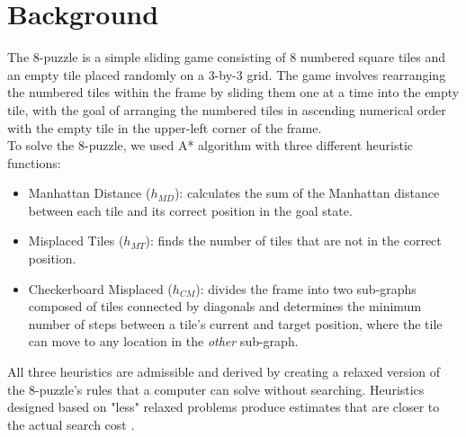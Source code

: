 
\section{Background}
\label{sec:background}
The 8-puzzle is a simple sliding game consisting of 8 numbered square tiles and an empty tile placed randomly on a 3-by-3 grid. 
The game involves rearranging the numbered tiles within the frame by sliding them one at a time into the empty tile, with the goal of arranging the numbered tiles in ascending numerical order with the empty tile in the upper-left corner of the frame. \\

\noindent To solve the 8-puzzle, we used A* algorithm with three different heuristic functions:
\begin{itemize}
  \item Manhattan Distance ($h_{MD}$): calculates the sum of the Manhattan distance between each tile and its correct position in the goal state.
  \item Misplaced Tiles ($h_{MT}$): finds the number of tiles that are not in the correct position.
  \item Checkerboard Misplaced ($h_{CM}$): divides the frame into two sub-graphs composed of tiles connected by diagonals and determines the minimum number of steps between a tile's current and target position, where the tile can move to any location in the \emph{other} sub-graph.
\end{itemize}

\noindent All three heuristics are admissible and derived by creating a relaxed version of the 8-puzzle’s rules that a computer can solve without searching. Heuristics designed based on "less" relaxed problems produce estimates that are closer to the actual search cost \cite{heuristics}.


